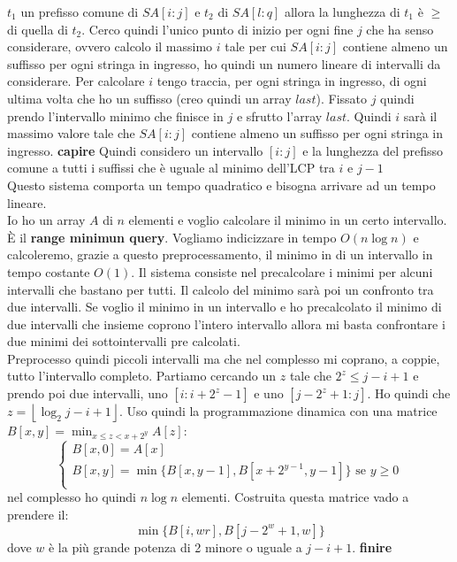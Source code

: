 \documentclass[a4paper,12pt, oneside]{book}
\begin{document}
$t_1$ un prefisso comune di $SA[i:j]$ e $t_2$ di $SA[l:q]$ allora la
lunghezza di $t_1$ è $\geq$ di quella di $t_2$. Cerco quindi l'unico
punto di inizio per ogni fine $j$ che ha senso considerare, ovvero
calcolo il massimo $i$ tale per cui $SA[i:j]$ contiene almeno un
suffisso per ogni stringa in ingresso, ho quindi un numero lineare di
intervalli da considerare. Per calcolare $i$ tengo traccia, per ogni
stringa in ingresso, di ogni ultima volta che ho un suffisso (creo
quindi un array $last$). Fissato $j$ quindi prendo l'intervallo minimo
che finisce in $j$ e sfrutto l'array $last$. Quindi $i$ sarà il
massimo valore tale che $SA[i:j]$ contiene almeno un suffisso per ogni
stringa in ingresso.
\textbf{capire}
Quindi considero un intervallo $[i:j]$ e la lunghezza del
prefisso comune a tutti i suffissi che è uguale al minimo dell'LCP tra
$i$ e $j-1$\\
Questo sistema comporta un tempo quadratico e bisogna arrivare ad un
tempo lineare.\\
Io ho un array $A$ di $n$ elementi e voglio calcolare il minimo in un
certo intervallo. È il \textbf{range minimun query}. Vogliamo
indicizzare in tempo $O(n\log n)$ e calcoleremo, grazie a questo
preprocessamento, il minimo in di un intervallo in tempo costante
$O(1)$. Il sistema consiste nel precalcolare i minimi per alcuni
intervalli che bastano per tutti. Il calcolo del minimo sarà poi un
confronto tra due intervalli. Se voglio il minimo in un intervallo e
ho precalcolato il minimo di due intervalli che insieme coprono
l'intero intervallo allora mi basta confrontare i due minimi dei
sottointervalli pre calcolati. \\
Preprocesso quindi piccoli intervalli ma che nel complesso mi coprano,
a coppie, tutto l'intervallo completo. Partiamo cercando un $z$ tale
che $2^z\leq j-i+1$ e prendo poi due intervalli, uno $[i:i+2^z-1]$ e
uno $[j-2^z+1:j]$. Ho quindi che $z=\left\lfloor{\log_2
    j-i+1}\right\rfloor$. Uso quindi la programmazione dinamica con
una matrice $B[x,y]=\min_{x\leq z<x+2^{y}}A[z]$:
\[
  \begin{cases}
    B[x,0]=A[x]\\
    B[x,y]=\min\{B[x,y-1], B[x+2^{y-1},y-1]\} \mbox { se } y\geq 0\\
  \end{cases}
\]
nel complesso ho quindi $n\log n$ elementi. Costruita questa matrice
vado a prendere il:
\[\min\{B[i,wr],B[j-2^w+1,w]\}\]
dove $w$ è la più grande potenza di 2 minore o uguale a $j-i+1$.
\textbf{finire}\\
\end{document}
